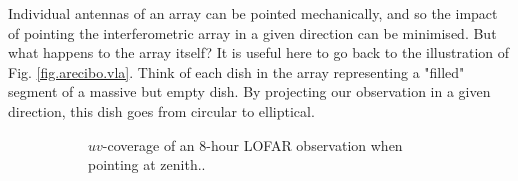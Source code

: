 \pg
Individual antennas of an array can be pointed mechanically, and so the impact of pointing the interferometric array in a given direction can be minimised. But what happens to the array itself? It is useful here to go back to the illustration of Fig. \ref{fig.arecibo.vla}. Think of each dish in the array representing a "filled" segment of a massive but empty dish. By projecting our observation in a given direction, this dish goes from circular to elliptical.
\begin{figure}[h]
\centering
\begin{subfigure}{.40\textwidth}
\caption{\label{fig.lofar.uvcoverage.zenith} $uv$-coverage of an 8-hour LOFAR observation when pointing at zenith..}
\end{subfigure}
\hfill
\begin{subfigure}{.40\textwidth}

\end{subfigure}
\end{figure}
